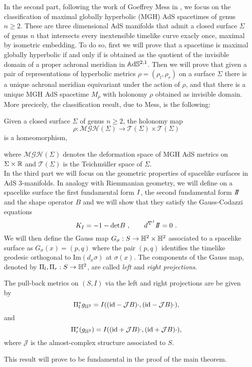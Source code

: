 In the second part, following the work of Goeffrey Mess in \cite{Mess}, we focus on the classification of maximal globally hyperbolic (MGH) AdS spacetimes of genus $n\geq 2$. These are three dimensional AdS manifolds that admit a closed surface $\Sigma$ of genus $n$ that intersects every inextensible timelike curve exacly once, maximal by isometric embedding.
To do so, first we will prove that a spacetime is maximal globally hyperbolic if and only if is obtained as the quotient of the invisible domain of a proper achronal meridian in $\mathbb{A}\mathrm{d}\mathbb{S}^{2,1}$. Then we will prove that given a pair of representations of hyperbolic metrics $\rho=(\rho_l, \rho_r)$ on a surface $\Sigma$ there is a unique achronal meridian equivariant under the action of $\rho$, and that there is a unique MGH AdS spacetime $M_\rho$ with holonomy $\rho$ obtained as invisible domain. More precicely, the classification result, due to Mess, is the following:
\begin{theorem*}
Given a closed surface $\Sigma$ of genus $n\geq 2$, the holonomy map $$\rho:\mathcal{MGH}(\Sigma)\to\mathcal{T}(\Sigma)\times\mathcal{T}(\Sigma)$$ is a homeomorphism,
\end{theorem*}
\noindent where $\mathcal{MGH}(\Sigma)$ denotes the deformation space of MGH AdS metrics on $\Sigma\times \mathbb{R}$ and $\mathcal{T}(\Sigma)$ is the Teichm\"uller space of $\Sigma$.\\

In the third part we will focus on the geometric properties of spacelike surfaces in AdS 3-manifolds. In analogy with Riemmanian geometry, we will define on a spacelike surface the first fundamental form $I$, the second fundamental form $\II$ and the shape operator $B$ and we will show that they satisfy the Gauss-Codazzi equations   
    \[
        K_\I = -1 - \text{det}B \ , \qquad d^{\nabla^\I}\II=0 \ .
    \]
We will then define the Gauss map $G_\sigma : S \to \mathbb{H}^2 \times \mathbb{H}^2$ associated to a spacelike surface as $G_\sigma(x) = (p,q)$ where the pair $(p,q)$ identifies the timelike geodesic orthogonal to $\text{Im}(d_x\sigma)$ at $\sigma(x)$. The components of the Gauss map, denoted by $\Pi_l, \Pi_r : S \to \mathbb{H}^2$, are called \textit{left} and \textit{right projections}.
\begin{proposition*}
    The pull-back metrics on $(S,I)$ via the left and right projections are be given by
    \[
        \Pi_l^*g_{\mathbb{H}^2}=I((\text{id}-\mathcal{J}B)\cdot,(\text{id}-\mathcal{J}B)\cdot),
    \]
        and
    \[
        \Pi_r^*(g_{\mathbb{H}^2})=I((\text{id}+\mathcal{J}B)\cdot,(\text{id}+\mathcal{J}B)\cdot),
    \]
where $\mathcal{J}$ is the almost-complex structure associated to $S$.
\end{proposition*}
This result will prove to be fundamental in the proof of the main theorem.\\

